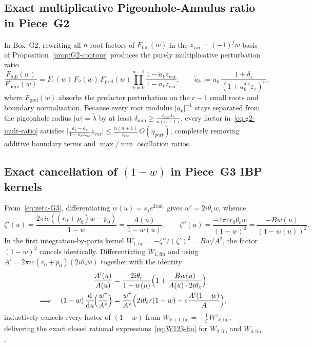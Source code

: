 \documentclass[10pt]{article}
\numberwithin{equation}{section}
\theoremstyle{plain}
\theoremstyle{definition}
\newcommand{\dd}{\mathrm{d}}
\newcommand{\1}{\mathbf{1}}
\begin{document}
\subsection{Exact multiplicative Pigeonhole-Annulus ratio in Piece~G2}
In Box~G2, rewriting all $n$ root factors of $F_{\mathrm{full}}(w)$ in the $z_{\mathrm{var}} = (-1)^j w$ basis of Proposition~\ref{prop:G2-contour} produces the purely multiplicative perturbation ratio
\begin{equation}\label{eq:g2-mult-ratio}
\frac{F_{\mathrm{full}}(w)}{F_{\mathrm{pure}}(w)}
= F_1(w)\, F_2(w)\, F_{\mathrm{pref}}(w) \prod_{k=0}^{n-1}\frac{1 - \tilde{a}_k z_{\mathrm{var}}}{1 - a_k z_{\mathrm{var}}},
\qquad \tilde{a}_k := a_k\,\frac{1 + \delta_z}{(1 + a_k^{\mathrm{alg}}\varepsilon_s)^n},
\end{equation}
where $F_{\mathrm{pref}}(w)$ absorbs the prefactor perturbation on the $c - 1$ small roots and boundary normalization. Because every root modulus $|a_k|^{-1}$ stays separated from the pigeonhole radius $|w| = \tilde{\lambda}$ by at least $\delta_{\min} \ge \frac{\varepsilon_{\mathrm{rad}}\lambda_*}{n(n+1)}$, every factor in~\eqref{eq:g2-mult-ratio} satisfies $\bigl|\frac{\tilde{a}_k - a_k}{1 - a_k z_{\mathrm{var}}} z_{\mathrm{var}}\bigr| \le \frac{n(n+1)}{\varepsilon_{\mathrm{rad}}}\, O(\eta_{\mathrm{pert}})$, completely removing additive boundary terms and $\max/\min$ oscillation ratios.

\subsection{Exact cancellation of \texorpdfstring{$(1 - w)$}{(1 - w)} in Piece~G3 IBP kernels}
From~\eqref{eq:zeta-G3}, differentiating $w(u) = s_j e^{2iu\theta_c}$ gives $w' = 2i\theta_c w$, whence
\[
\zeta'(u) = \frac{2\pi i c((r_0 + p_0)w - p_0)}{1 - w} = \frac{A(u)}{1 - w(u)},
\qquad
\zeta''(u) = \frac{-4\pi c r_0 \theta_c w}{(1 - w)^2} = \frac{-B w(u)}{(1 - w(u))^2}.
\]
In the first integration-by-parts kernel $W_{1,\mathrm{fin}} = -\zeta''/(\zeta')^2 = Bw / A^2$, the factor $(1 - w)^2$ cancels identically. Differentiating $W_{1,\mathrm{fin}}$ and using $A' = 2\pi i c(r_0 + p_0)(2i\theta_c w)$ together with the identity
\begin{align*}
\frac{A'(u)}{A(u)} &= \frac{2i\theta_c}{1 - w(u)}\Bigl(1 + \frac{B w(u)}{A(u) \cdot 2i\theta_c}\Bigr) \\
\Longrightarrow\quad (1 - w)\,\frac{\dd}{\dd u}\!\Bigl(\frac{w^r}{A^s}\Bigr) &= \frac{w^r}{A^s}\Bigl(2i\theta_c r (1 - w) - s\frac{A'(1 - w)}{A}\Bigr),
\end{align*}
inductively cancels every factor of $(1 - w)$ from $W_{k+1,\mathrm{fin}} = -\frac{1}{\zeta'} W'_{k,\mathrm{fin}}$, delivering the exact closed rational expressions~\eqref{eq:W123-fin} for $W_{2,\mathrm{fin}}$ and $W_{3,\mathrm{fin}}$.
\end{document}
